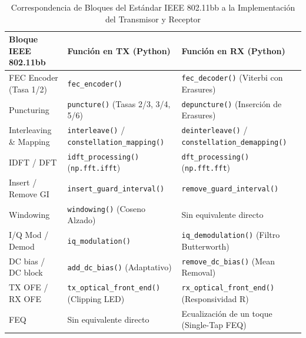 \begin{table}[H]
\centering
\caption{Correspondencia de Bloques del Estándar IEEE 802.11bb a la Implementación del Transmisor y Receptor}
\label{tab:bloques}
\begin{tabular}{|p{4.5cm}|p{4.8cm}|p{5cm}|}
\hline
\textbf{Bloque IEEE 802.11bb} & \textbf{Función en TX (Python)} & \textbf{Función en RX (Python)} \\ \hline
FEC Encoder (Tasa 1/2) & \texttt{fec\_encoder()} & \texttt{fec\_decoder()} (Viterbi con Erasures) \\ \hline
Puncturing & \texttt{puncture()} (Tasas 2/3, 3/4, 5/6) & \texttt{depuncture()} (Inserción de Erasures) \\ \hline
Interleaving \& Mapping & \texttt{interleave()} / \texttt{constellation\_mapping()} & \texttt{deinterleave()} / \texttt{constellation\_demapping()} \\ \hline
IDFT / DFT & \texttt{idft\_processing()} (\texttt{np.fft.ifft}) & \texttt{dft\_processing()} (\texttt{np.fft.fft}) \\ \hline
Insert / Remove GI & \texttt{insert\_guard\_interval()} & \texttt{remove\_guard\_interval()} \\ \hline
Windowing & \texttt{windowing()} (Coseno Alzado) & Sin equivalente directo \\ \hline
I/Q Mod / Demod & \texttt{iq\_modulation()} & \texttt{iq\_demodulation()} (Filtro Butterworth) \\ \hline
DC bias / DC block & \texttt{add\_dc\_bias()} (Adaptativo) & \texttt{remove\_dc\_bias()} (Mean Removal) \\ \hline
TX OFE / RX OFE & \texttt{tx\_optical\_front\_end()} (Clipping LED) & \texttt{rx\_optical\_front\_end()} (Responsividad R) \\ \hline
FEQ & Sin equivalente directo & Ecualización de un toque (Single-Tap FEQ) \\ \hline
\end{tabular}
\end{table}

